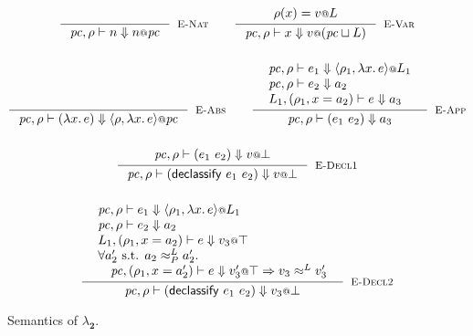 \documentclass{article}
\makeatletter
\newcommand{\at}{\ensuremath{{\scriptstyle{@}}}}
\newcommand{\pc}{\ensuremath{{\mathit{pc}}}}
\theoremstyle{definition}
\makeatother
\begin{document}
\begin{figure}[h]
  \centering
  \begin{gather*}
    \inference{}{
      \pc, \rho |- n \Downarrow n \at \pc
    }[\textsc{E-Nat}]
    \qquad
    \inference{
      {\begin{array}{l}
          \rho(x) = v \at L
        \end{array}}
    }{
      \pc, \rho |- x \Downarrow v \at (\pc \sqcup L)
    }[\textsc{E-Var}]
    \\[3ex]
    \inference{}{
      \pc, \rho |- (\lambda{x}.\, e) \Downarrow
      \langle{\rho, \lambda{x}.\, e\rangle} \at \pc
    }[\textsc{E-Abs}]
    \qquad
    \inference{
      {\begin{array}{l}
          \pc, \rho |- e_1 \Downarrow
          \langle{\rho_1, \lambda{x}.\, e\rangle} \at L_1
          \\
          \pc, \rho |- e_2 \Downarrow a_2
          \\
          L_1, (\rho_1, x = a_2) |- e \Downarrow a_3
        \end{array}}
    }{
      \pc, \rho |- (e_1\ e_2) \Downarrow a_3
    }[\textsc{E-App}]
    \\[3ex]
    \inference{
      {\begin{array}{l}
          \pc, \rho |- (e_1\ e_2) \Downarrow v \at \bot
        \end{array}}
    }{
      \pc, \rho |- (\mathsf{declassify}\ e_1\ e_2) \Downarrow v \at \bot
    }[\textsc{E-Decl1}]
    \\[3ex]
    \inference{
      {\begin{array}{l}
          \pc, \rho |- e_1 \Downarrow
          \langle{\rho_1, \lambda{x}.\, e\rangle} \at L_1
          \\
          \pc, \rho |- e_2 \Downarrow a_2
          \\
          L_1, (\rho_1, x = a_2) |- e \Downarrow v_3 \at \top
          \\
          \forall{a_2' \text{ s.t. } a_2 \approx^{L}_{P} a_2'}.\, 
          \\\quad
          \pc, (\rho_1, x = a_2') |- e \Downarrow v_3' \at \top =>
          v_3 \approx^{L} v_3'
        \end{array}}
    }{
      \pc, \rho |- (\mathsf{declassify}\ e_1\ e_2) \Downarrow v_3 \at \bot
    }[\textsc{E-Decl2}]
  \end{gather*}
  \caption{Semantics of $\lambda_{\mathbf{2}}$.}
  \label{fig:semantics}
\end{figure}
\end{document}
